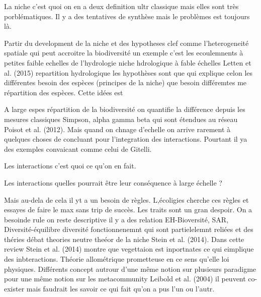 La niche c'est quoi on en a deux definition ultr classique mais elles
sont très porblématiques. Il y a des tentatives de synthèse mais le
problèmes est toujours là.

Partir du development de la niche et des hypotheses clef comme
l'heterogeneité spatiale qui peut accroitre la biodiversité un exemple
c'est les ecoulemnents à petites faible echelles de l'hydrologie niche
hdrologique à fable échelles Letten et al. (2015) repartition
hydrologique les hypothèses sont que qui explique celon les différentes
besoin des espèces (principes de la niche) que besoin différemtes me
répartition des espèces. Cette idées est

A large espes répartition de la biodiversité on quantifie la différence
depuis les mesures classiques Simpson, alpha gamma beta qui sont
étendues au réseau Poisot et al. (2012). Mais quand on chnage d'echelle
on arrive rarement à quelques choses de concluant pour l'integration des
interactions. Pourtant il ya des exemples convaicant comme celui de
Gitelli.

Les interactions c'est quoi ce qu'on en fait.

Les interactions quelles pourrait être leur conséquence à large échelle
?

Mais au-dela de cela il yt a un besoin de règles. L,écoligies cherche
ces règles et essayes de faire le max sans trip de succès. Les traits
sont un gran despoir. On a besoinde rule on reste descriptive il y a des
relation EH-Bioversité, SAR, Diversité-équilibre diversité
fonctionnenemnt qui sont partielelemnt reliées et des théries débat
theories neutre theéor de la niche Stein et al. (2014). Dans cette
review Stein et al. (2014) montre que vegettaion est inportnates ce qui
eimplique des inbteractions. Théorie allométrique prometteuse en ce sens
qu'elle loi physiques. Différents concept autrour d'une même notion sur
plusieurs paradigme pour une même notion sur les metacommunity Leibold
et al. (2004) il peuvent co-exister mais faudrait les savoir ce qui fait
qu'on a pus l'un ou l'autr.


